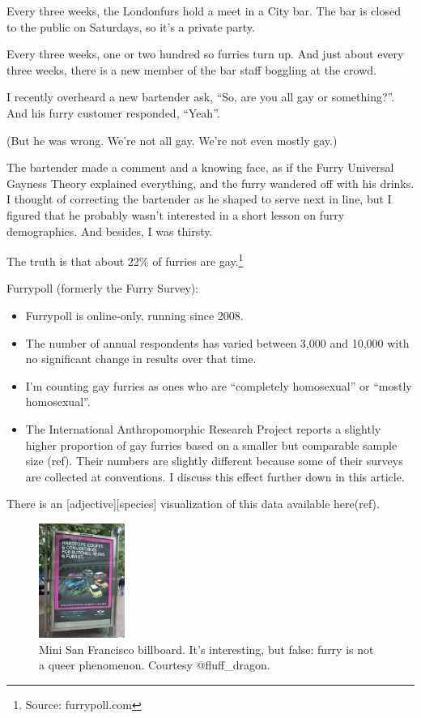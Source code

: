 
Every three weeks, the Londonfurs hold a meet in a City bar. The bar is closed to the public on Saturdays, so it's a private party.

Every three weeks, one or two hundred so furries turn up. And just about every three weeks, there is a new member of the bar staff boggling at the crowd.

I recently overheard a new bartender ask, ``So, are you all gay or something?''. And his furry customer responded, ``Yeah''.

(But he was wrong. We're not all gay. We're not even mostly gay.)

The bartender made a comment and a knowing face, as if the Furry Universal Gayness Theory explained everything, and the furry wandered off with his drinks. I thought of correcting the bartender as he shaped to serve next in line, but I figured that he probably wasn't interested in a short lesson on furry demographics. And besides, I was thirsty.

The truth is that about 22\% of furries are gay.\footnote{Source: furrypoll.com}

Furrypoll (formerly the Furry Survey):

\begin{itemize}
  \item Furrypoll is online-only, running since 2008.
  \item The number of annual respondents has varied between 3,000 and 10,000 with no significant change in results over that time.
  \item I'm counting gay furries as ones who are ``completely homosexual'' or ``mostly homosexual''.
  \item The International Anthropomorphic Research Project reports a slightly higher proportion of gay furries based on a smaller but comparable sample size (ref). Their numbers are slightly different because some of their surveys are collected at conventions. I discuss this effect further down in this article.
\end{itemize}

There is an [adjective][species] visualization of this data available here(ref).

\begin{figure}
  \begin{center}
    \includegraphics[width=0.25\textwidth]{content/assets/not-all-gay--mini}
  \end{center}
  \caption{Mini San Francisco billboard. It's interesting, but false: furry is not a queer phenomenon. Courtesy @fluff\_dragon.}
\end{figure}

